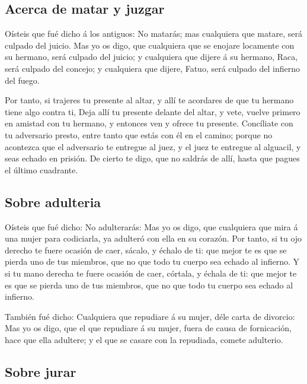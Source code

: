 \hypertarget{acerca-de-matar-y-juzgar}{%
\subsection{Acerca de matar y juzgar}\label{acerca-de-matar-y-juzgar}}

 Oísteis que fué dicho á los antiguos: No matarás; mas
cualquiera que matare, será culpado del juicio.  Mas yo
os digo, que cualquiera que se enojare locamente con su hermano, será
culpado del juicio; y cualquiera que dijere á su hermano, Raca, será
culpado del concejo; y cualquiera que dijere, Fatuo, será culpado del
infierno del fuego.

 Por tanto, si trajeres tu presente al altar, y allí te
acordares de que tu hermano tiene algo contra ti,  Deja
allí tu presente delante del altar, y vete, vuelve primero en amistad
con tu hermano, y entonces ven y ofrece tu presente. 
Concíliate con tu adversario presto, entre tanto que estás con él en el
camino; porque no acontezca que el adversario te entregue al juez, y el
juez te entregue al alguacil, y seas echado en prisión. 
De cierto te digo, que no saldrás de allí, hasta que pagues el último
cuadrante.

\hypertarget{sobre-adulteria}{%
\subsection{Sobre adulteria}\label{sobre-adulteria}}

 Oísteis que fué dicho: No adulterarás: 
Mas yo os digo, que cualquiera que mira á una mujer para codiciarla, ya
adulteró con ella en su corazón.  Por tanto, si tu ojo
derecho te fuere ocasión de caer, sácalo, y échalo de ti: que mejor te
es que se pierda uno de tus miembros, que no que todo tu cuerpo sea
echado al infierno.  Y si tu mano derecha te fuere
ocasión de caer, córtala, y échala de ti: que mejor te es que se pierda
uno de tus miembros, que no que todo tu cuerpo sea echado al infierno.

 También fué dicho: Cualquiera que repudiare á su mujer,
déle carta de divorcio:  Mas yo os digo, que el que
repudiare á su mujer, fuera de causa de fornicación, hace que ella
adultere; y el que se casare con la repudiada, comete adulterio.

\hypertarget{sobre-jurar}{%
\subsection{Sobre jurar}\label{sobre-jurar}}

